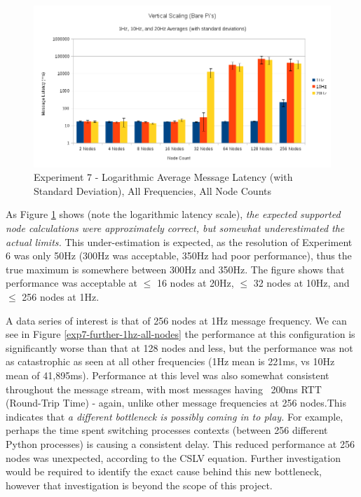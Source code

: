 \documentclass[../dissertation.tex]{subfiles}
\begin{document}
\begin{figure}[H]
\centering
\includegraphics[width=\textwidth]{images/experiment8/vertical_scaling_all_freqs_log_avg_msg_latency.png}
\caption{Experiment 7 - Logarithmic Average Message Latency (with Standard Deviation), All Frequencies, All Node Counts}
\label{exp7-further-all-freqs-averages}
\end{figure}

As Figure \ref{exp7-further-all-freqs-averages} shows (note the logarithmic latency scale), \textit{the expected supported node calculations were approximately correct, but somewhat underestimated the actual limits.} This under-estimation is expected, as the resolution of Experiment 6 was only 50Hz (300Hz was acceptable, 350Hz had poor performance), thus the true maximum is somewhere between 300Hz and 350Hz. The figure shows that performance was acceptable at $\leq$ 16 nodes at 20Hz, $\leq$ 32 nodes at 10Hz, and $\leq$ 256 nodes at 1Hz.

A data series of interest is that of 256 nodes at 1Hz message frequency. We can see in Figure \ref{exp7-further-1hz-all-nodes} the performance at this configuration is significantly worse than that at 128 nodes and less, but the performance was not as catastrophic as seen at all other frequencies (1Hz mean is 221ms, vs 10Hz mean of 41,895ms). Performance at this level was also somewhat consistent throughout the message stream, with most messages having ~200ms RTT (Round-Trip Time) - again, unlike other message frequencies at 256 nodes.This indicates that  \textit{a different bottleneck is possibly coming in to play.} For example, perhaps the time spent switching processes contexts (between 256 different Python processes) is causing a consistent delay. This reduced performance at 256 nodes was unexpected, according to the CSLV equation. Further investigation would be required to identify the exact cause behind this new bottleneck, however that investigation is beyond the scope of this project.
\end{document}
